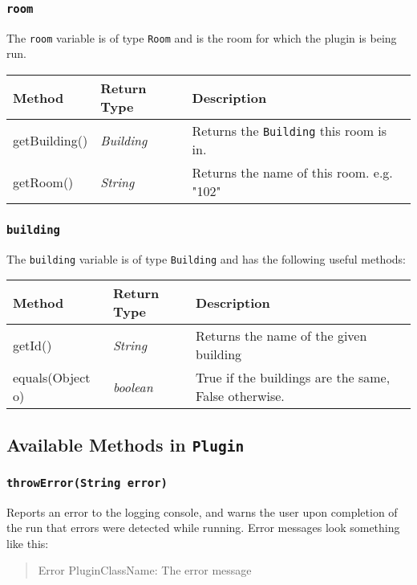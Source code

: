 \documentclass[12pt,a4paper]{article}
\begin{document}
\subsubsection[room]{\texttt{room}}
The \texttt{room} variable is of type \texttt{Room} and is the room for which the plugin is being run.

\begin{center}
\begin{tabular}{p{3cm}p{3cm}p{6.5cm}}
	\hline
	\textbf{Method} & \textbf{Return Type} & \textbf{Description}\\ 
	\hline
	getBuilding()& \emph{Building} & Returns the \texttt{Building} this room is in.\\ 
	\hline
	getRoom()& \emph{String} & Returns the name of this room. e.g. "102"\\
	\hline
\end{tabular}
\end{center}

\subsubsection[building]{\texttt{building}}
The \texttt{building} variable is of type \texttt{Building} and has the following useful methods:

\begin{center}
\begin{tabular}{p{3cm}p{3cm}p{6.5cm}}
	\hline
	\textbf{Method} & \textbf{Return Type} & \textbf{Description}\\ 
	\hline
	getId()& \emph{String} & Returns the name of the given building\\ 
	\hline
	equals(Object o)& \emph{boolean} & {True if the buildings are the same, False otherwise.}\\
	\hline
\end{tabular}
\end{center}

\subsection[Available Methods in Plugin]{Available Methods in \texttt{Plugin}}
\subsubsection{\texttt{throwError(String error)}}
Reports an error to the logging console, and warns the user upon completion of the run that errors were detected while running. Error messages look something like this:
\begin{quote}
Error PluginClassName: The error message
\end{quote}
\end{document}

